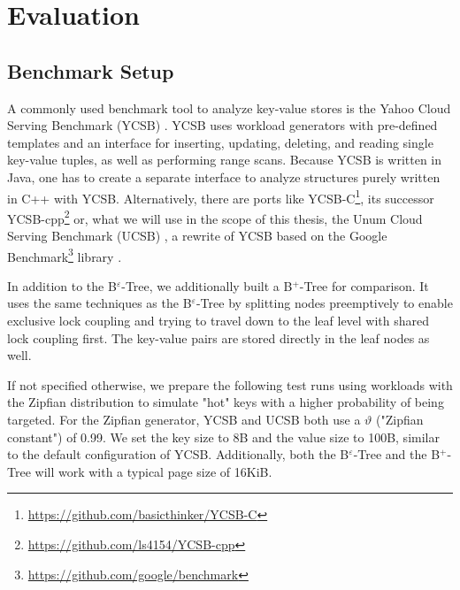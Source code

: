 
\newcommand{\verticalplotscale}{0.89}

\chapter{Evaluation}\label{chapter:evaluation}

\section{Benchmark Setup}

A commonly used benchmark tool to analyze key-value stores is the Yahoo Cloud Serving Benchmark (YCSB) \cite{ycsb}. YCSB uses workload generators with pre-defined templates and an interface for inserting, updating, deleting, and reading single key-value tuples, as well as performing range scans.\newline
Because YCSB is written in Java, one has to create a separate interface to analyze structures purely written in C++ with YCSB. Alternatively, there are ports like YCSB-C\footnote{\href{https://github.com/basicthinker/YCSB-C}{https://github.com/basicthinker/YCSB-C}}, its successor YCSB-cpp\footnote{\href{https://github.com/ls4154/YCSB-cpp}{https://github.com/ls4154/YCSB-cpp}} or, what we will use in the scope of this thesis, the Unum Cloud Serving Benchmark (UCSB) \cite{ucsb}, a rewrite of YCSB based on the Google Benchmark\footnote{\href{https://github.com/google/benchmark}{https://github.com/google/benchmark}} library \cite{unum_ucsb}.

In addition to the B$^\varepsilon$-Tree, we additionally built a B$^+$-Tree for comparison. It uses the same techniques as the B$^\varepsilon$-Tree by splitting nodes preemptively to enable exclusive lock coupling and trying to travel down to the leaf level with shared lock coupling first. The key-value pairs are stored directly in the leaf nodes as well.

If not specified otherwise, we prepare the following test runs using workloads with the Zipfian distribution to simulate "hot" keys with a higher probability of being targeted. For the Zipfian generator, YCSB and UCSB both use a $\vartheta$ ("Zipfian constant") of 0.99. We set the key size to 8B and the value size to 100B, similar to the default configuration of YCSB. Additionally, both the B$^\varepsilon$-Tree and the B$^+$-Tree will work with a typical page size of 16KiB.

